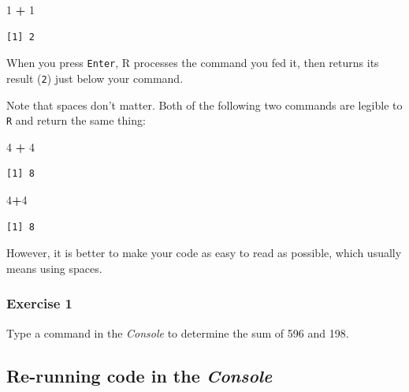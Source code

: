 \documentclass[
]{book}
\newenvironment{Shaded}{\begin{snugshade}}{\end{snugshade}}
\newcommand{\DecValTok}[1]{\textcolor[rgb]{0.00,0.00,0.81}{#1}}
\newcommand{\OperatorTok}[1]{\textcolor[rgb]{0.81,0.36,0.00}{\textbf{#1}}}
\newcommand{\StringTok}[1]{\textcolor[rgb]{0.31,0.60,0.02}{#1}}
\begin{document}
\begin{Shaded}
\begin{Highlighting}[]
\DecValTok{1} \OperatorTok{+}\StringTok{ }\DecValTok{1}
\end{Highlighting}
\end{Shaded}

\begin{verbatim}
[1] 2
\end{verbatim}

When you press \texttt{Enter}, R processes the command you fed it, then returns its result (\texttt{2}) just below your command.

Note that spaces don't matter. Both of the following two commands are legible to \texttt{R} and return the same thing:

\begin{Shaded}
\begin{Highlighting}[]
\DecValTok{4} \OperatorTok{+}\StringTok{ }\DecValTok{4}
\end{Highlighting}
\end{Shaded}

\begin{verbatim}
[1] 8
\end{verbatim}

\begin{Shaded}
\begin{Highlighting}[]
\DecValTok{4}\OperatorTok{+}\DecValTok{4}
\end{Highlighting}
\end{Shaded}

\begin{verbatim}
[1] 8
\end{verbatim}

However, it is better to make your code as easy to read as possible, which usually means using spaces.

\hypertarget{exercise-1}{%
\subsubsection*{Exercise 1}\label{exercise-1}}

Type a command in the \emph{Console} to determine the sum of 596 and 198.

\hypertarget{re-running-code-in-the-console}{%
\subsection*{\texorpdfstring{Re-running code in the \emph{Console}}{Re-running code in the Console}}\label{re-running-code-in-the-console}}
\end{document}
